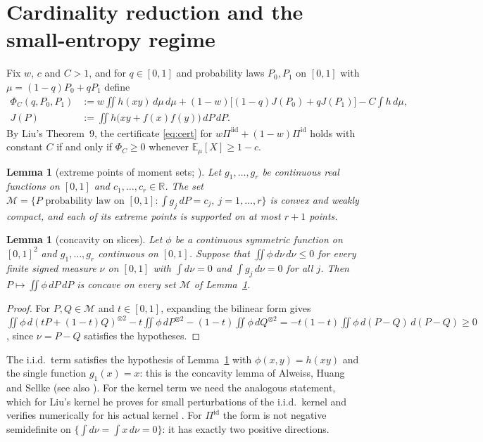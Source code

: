 \documentclass[11pt,a4paper]{article}
\newtheorem{lemma}[theorem]{Lemma}
\theoremstyle{definition}
\theoremstyle{remark}
\newcommand{\E}{\mathbb{E}}
\newcommand{\R}{\mathbb{R}}
\newcommand{\cM}{\mathcal{M}}
\newcommand{\ent}{h}
\newcommand{\iid}{\mathrm{iid}}
\newcommand{\id}{\mathrm{id}}
\begin{document}
\section{Cardinality reduction and the small-entropy regime}\label{sec:card}
Fix $w$, $c$ and $C>1$, and for $q\in[0,1]$ and probability laws $P_0,P_1$ on $[0,1]$ with $\mu=(1-q)P_0+qP_1$ define
\begin{equation}\label{eq:Phi}
\begin{aligned}
\Phi_C(q,P_0,P_1)&:=w\iint\ent(xy)\,d\mu\,d\mu+(1-w)\Big[(1-q)J(P_0)+qJ(P_1)\Big]-C\int\ent\,d\mu,\\
J(P)&:=\iint\ent\big(xy+f(x)f(y)\big)\,dP\,dP.
\end{aligned}
\end{equation}
By Liu's Theorem~9, the certificate \eqref{eq:cert} for $w\Pi^{\iid}+(1-w)\Pi^{\id}$ holds with constant $C$ if and only if $\Phi_C\ge0$ whenever $\E_\mu[X]\ge1-c$.

\begin{lemma}[extreme points of moment sets; \cite{Karr,Winkler}]\label{lem:extreme}
Let $g_1,\dots,g_r$ be continuous real functions on $[0,1]$ and $c_1,\dots,c_r\in\R$. The set $\cM=\{P\text{ probability law on }[0,1]:\int g_j\,dP=c_j,\ j=1,\dots,r\}$ is convex and weakly compact, and each of its extreme points is supported on at most $r+1$ points.
\end{lemma}

\begin{lemma}[concavity on slices]\label{lem:concave}
Let $\phi$ be a continuous symmetric function on $[0,1]^2$ and $g_1,\dots,g_r$ continuous on $[0,1]$. Suppose that $\iint\phi\,d\nu\,d\nu\le0$ for every finite signed measure $\nu$ on $[0,1]$ with $\int d\nu=0$ and $\int g_j\,d\nu=0$ for all $j$. Then $P\mapsto\iint\phi\,dP\,dP$ is concave on every set $\cM$ of Lemma~\ref{lem:extreme}.
\end{lemma}
\begin{proof}
For $P,Q\in\cM$ and $t\in[0,1]$, expanding the bilinear form gives $\iint\phi\,d(tP+(1-t)Q)^{\otimes2}-t\iint\phi\,dP^{\otimes2}-(1-t)\iint\phi\,dQ^{\otimes2}=-t(1-t)\iint\phi\,d(P-Q)\,d(P-Q)\ge0$, since $\nu=P-Q$ satisfies the hypotheses.
\end{proof}

The i.i.d.\ term satisfies the hypothesis of Lemma~\ref{lem:concave} with $\phi(x,y)=\ent(xy)$ and the single function $g_1(x)=x$: this is the concavity lemma of Alweiss, Huang and Sellke \cite[Lemma~5]{AHS} (see also \cite[proof of Theorem~9]{Liu}). For the kernel term we need the analogous statement, which for Liu's kernel he proves for small perturbations of the i.i.d.\ kernel and verifies numerically for his actual kernel \cite[Section~V-A]{Liu}. For $\Pi^{\id}$ the form is not negative semidefinite on $\{\int d\nu=\int x\,d\nu=0\}$: it has exactly two positive directions.
\end{document}
